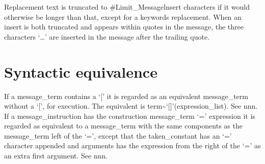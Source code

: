 Replacement text is truncated to \#Limit\_Messagelnsert characters if it
would otherwise be longer than that, except for a keywords replacement.
When an insert is both truncated and appears within quotes in the
message, the three characters `\ldots{}' are inserted in the message
after the trailing quote.

\hypertarget{syntactic-equivalence}{%
\section{Syntactic equivalence}\label{syntactic-equivalence}}

If a message\_term contains a `{[}' it is regarded as an equivalent
message\_term without a `{[}', for execution. The equivalent is
term\textasciitilde{}`{[}{]}'(expression\_list). See nnn. If a
message\_instruction has the construction message\_term `=' expression
it is regarded as equivalent to a message\_term with the same components
as the message\_term left of the `=', except that the taken\_constant
has an `=' character appended and arguments has the expression from the
right of the `=' as an extra first argument. See nnn.
